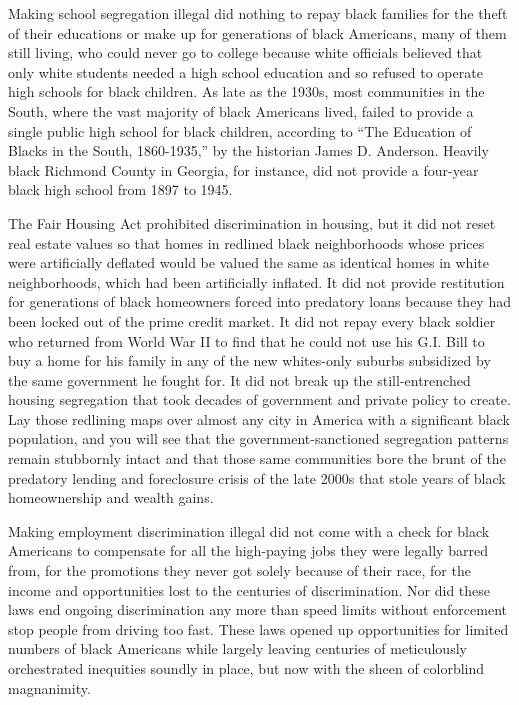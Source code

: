 Making school segregation illegal did nothing to repay black families
for the theft of their educations or make up for generations of black
Americans, many of them still living, who could never go to college
because white officials believed that only white students needed a high
school education and so refused to operate high schools for black
children. As late as the 1930s, most communities in the South, where the
vast majority of black Americans lived, failed to provide a single
public high school for black children, according to ``The Education of
Blacks in the South, 1860-1935,'' by the historian James D. Anderson.
Heavily black Richmond County in Georgia, for instance, did not provide
a four-year black high school from 1897 to 1945.

The Fair Housing Act prohibited discrimination in housing, but it did
not reset real estate values so that homes in redlined black
neighborhoods whose prices were artificially deflated would be valued
the same as identical homes in white neighborhoods, which had been
artificially inflated. It did not provide restitution for generations of
black homeowners forced into predatory loans because they had been
locked out of the prime credit market. It did not repay every black
soldier who returned from World War II to find that he could not use his
G.I. Bill to buy a home for his family in any of the new whites-only
suburbs subsidized by the same government he fought for. It did not
break up the still-entrenched housing segregation that took decades of
government and private policy to create. Lay those redlining maps over
almost any city in America with a significant black population, and you
will see that the government-sanctioned segregation patterns remain
stubbornly intact and that those same communities bore the brunt of the
predatory lending and foreclosure crisis of the late 2000s that stole
years of black homeownership and wealth gains.

Making employment discrimination illegal did not come with a check for
black Americans to compensate for all the high-paying jobs they were
legally barred from, for the promotions they never got solely because of
their race, for the income and opportunities lost to the centuries of
discrimination. Nor did these laws end ongoing discrimination any more
than speed limits without enforcement stop people from driving too fast.
These laws opened up opportunities for limited numbers of black
Americans while largely leaving centuries of meticulously orchestrated
inequities soundly in place, but now with the sheen of colorblind
magnanimity.

